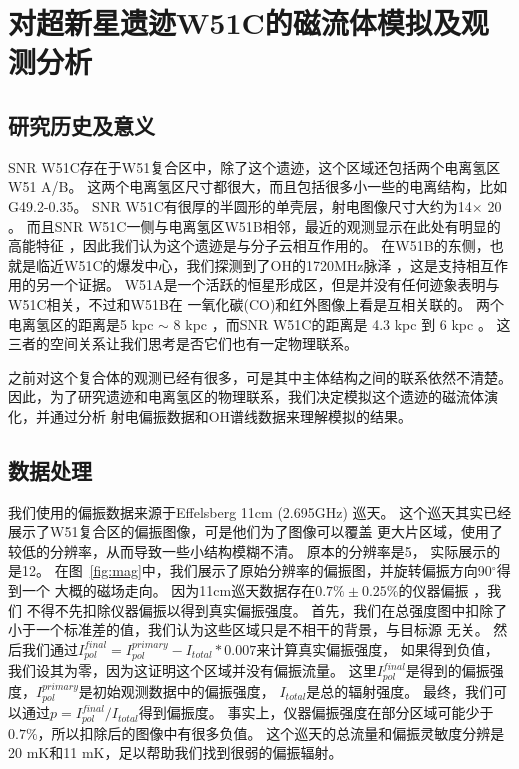 \chapter{对超新星遗迹W51C的磁流体模拟及观测分析}
\label{W51C}



\section{研究历史及意义}
\label{W51Cintro}
SNR W51C存在于W51复合区中，除了这个遗迹，这个区域还包括两个电离氢区W51 A/B。
这两个电离氢区尺寸都很大，而且包括很多小一些的电离结构，比如G49.2-0.35。
SNR W51C有很厚的半圆形的单壳层，射电图像尺寸大约为14\am $\times$ 20\am
\citep{Copetti1991,Subrahmanyan1995}。
而且SNR W51C一侧与电离氢区W51B相邻，最近的观测显示在此处有明显的高能特征
\citep{Abdo2009,Aleksic2012}，因此我们认为这个遗迹是与分子云相互作用的。
在W51B的东侧，也就是临近W51C的爆发中心，我们探测到了OH的1720MHz脉泽
\citep{Hewitt2008,Brogan2013}，这是支持相互作用的另一个证据。
W51A是一个活跃的恒星形成区，但是并没有任何迹象表明与W51C相关，不过和W51B在
一氧化碳(CO)和红外图像上看是互相关联的\citep{Kang2010,Parsons2012,Ginsburg2015}。
两个电离氢区的距离是5 kpc $\sim$ 8 kpc
\citep{Genzel1981,Schneps1981,Xu2009,Sato2010,Tian2013}，而SNR W51C的距离是
4.3 kpc \citep{Tian2013} 到 6 kpc \citep{Koo1995}。
这三者的空间关系让我们思考是否它们也有一定物理联系。

之前对这个复合体的观测已经有很多，可是其中主体结构之间的联系依然不清楚。
因此，为了研究遗迹和电离氢区的物理联系，我们决定模拟这个遗迹的磁流体演化，并通过分析
射电偏振数据和OH谱线数据来理解模拟的结果。

\section{数据处理}
\label{W51Cdata}

我们使用的偏振数据来源于Effelsberg 11cm (2.695GHz) 巡天\citep{1999A&A...350..447D}。
这个巡天其实已经展示了W51复合区的偏振图像，可是他们为了图像可以覆盖
更大片区域，使用了较低的分辨率，从而导致一些小结构模糊不清。
原本的分辨率是5\am， 实际展示的是12\am。
在图~\ref{fig:mag}中，我们展示了原始分辨率的偏振图，并旋转偏振方向90$^{\circ}$得到一个
大概的磁场走向。
因为11cm巡天数据存在$0.7\% \pm 0.25\%$的仪器偏振 \citep{1987A&AS...69..451J}，我们
不得不先扣除仪器偏振以得到真实偏振强度。
首先，我们在总强度图中扣除了小于一个标准差的值，我们认为这些区域只是不相干的背景，与目标源
无关。
然后我们通过$I^{final}_{pol}=I^{primary}_{pol}-I_{total}*0.007$来计算真实偏振强度，
如果得到负值，我们设其为零，因为这证明这个区域并没有偏振流量。
这里$I^{final}_{pol}$是得到的偏振强度，$I^{primary}_{pol}$是初始观测数据中的偏振强度，
$I_{total}$是总的辐射强度。
最终，我们可以通过$p=I^{final}_{pol}/I_{total}$得到偏振度。
事实上，仪器偏振强度在部分区域可能少于$0.7\%$，所以扣除后的图像中有很多负值。
这个巡天的总流量和偏振灵敏度分辨是20 mK和11 mK，足以帮助我们找到很弱的偏振辐射。

